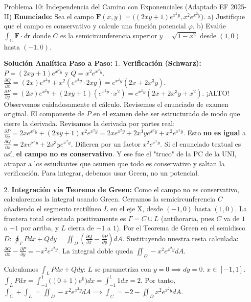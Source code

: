 \documentclass[11pt,a4paper]{article}
\begin{document}
\begin{ejerciciobox}{Problema 10: Independencia del Camino con Exponenciales (Adaptado EF 2025-II)}
\textbf{Enunciado:}
Sea el campo $\mathbf{F}(x,y) = \big( (2xy+1)e^{x^2y}, x^2 e^{x^2y} \big)$.
a) Justifique que el campo es conservativo y calcule una función potencial $\varphi$.
b) Evalúe $\int_C \mathbf{F} \cdot d\mathbf{r}$ donde $C$ es la semicircunferencia superior $y = \sqrt{1-x^2}$ desde $(1,0)$ hasta $(-1,0)$.

\textbf{Solución Analítica Paso a Paso:}
1. \textbf{Verificación (Schwarz):}
$P = (2xy+1)e^{x^2y}$ y $Q = x^2 e^{x^2y}$.
$\frac{\partial Q}{\partial x} = (2x)e^{x^2y} + x^2 (e^{x^2y} \cdot 2xy) = e^{x^2y}(2x + 2x^3 y)$.
$\frac{\partial P}{\partial y} = (2x)e^{x^2y} + (2xy+1)(e^{x^2y} \cdot x^2) = e^{x^2y}(2x + 2x^3 y + x^2)$.
¡ALTO! Observemos cuidadosamente el cálculo. Revisemos el enunciado de examen original. El componente de $P$ en el examen debe ser estructurado de modo que cierre la derivada. Revisamos la derivada por partes real:
$\frac{\partial P}{\partial y} = 2x e^{x^2y} + (2xy+1) x^2 e^{x^2y} = 2x e^{x^2y} + 2x^3y e^{x^2y} + x^2 e^{x^2y}$.
Esto \textbf{no es igual} a $\frac{\partial Q}{\partial x} = 2x e^{x^2y} + 2x^3y e^{x^2y}$. Difieren por un factor $x^2 e^{x^2y}$.
Si el enunciado textual es así, \textbf{el campo no es conservativo}. Y ese fue el "truco" de la PC de la UNI, atrapar a los estudiantes que asumen que todo es conservativo y saltan la verificación.
Para integrar, debemos usar Green, no un potencial.

2. \textbf{Integración vía Teorema de Green:}
Como el campo no es conservativo, calcularemos la integral usando Green.
Cerramos la semicircunferencia $C$ añadiendo el segmento rectilíneo $L$ en el eje X, desde $(-1,0)$ hasta $(1,0)$.
La frontera total orientada positivamente es $\Gamma = C \cup L$ (antihoraria, pues $C$ va de $1$ a $-1$ por arriba, y $L$ cierra de $-1$ a $1$).
Por el Teorema de Green en el semidisco $D$:
$\oint_\Gamma P dx + Q dy = \iint_D \left( \frac{\partial Q}{\partial x} - \frac{\partial P}{\partial y} \right) dA$.
Sustituyendo nuestra resta calculada:
$\frac{\partial Q}{\partial x} - \frac{\partial P}{\partial y} = -x^2 e^{x^2y}$.
La integral doble queda $\iint_D -x^2 e^{x^2y} dA$.

Calculamos $\int_L P dx + Q dy$:
$L$ se parametriza con $y=0 \implies dy=0$. $x \in [-1, 1]$.
$\int_L P dx = \int_{-1}^1 \big( (0+1)e^0 \big) dx = \int_{-1}^1 1 dx = 2$.
Por tanto, $\int_C + \int_L = \iint_D -x^2 e^{x^2y} dA \implies \int_C = -2 - \iint_D x^2 e^{x^2y} dA$.

\end{ejerciciobox}
\end{document}
